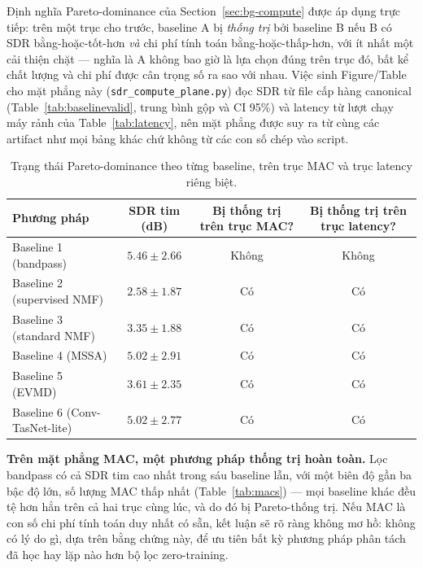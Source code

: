\documentclass[11pt]{article}
\begin{document}
Định nghĩa Pareto-dominance của Section~\ref{sec:bg-compute} được áp
dụng trực tiếp: trên một trục cho trước, baseline A bị \emph{thống trị}
bởi baseline B nếu B có SDR bằng-hoặc-tốt-hơn \emph{và} chi phí tính
toán bằng-hoặc-thấp-hơn, với ít nhất một cải thiện chặt --- nghĩa là A
không bao giờ là lựa chọn đúng trên trục đó, bất kể chất lượng và chi
phí được cân trọng số ra sao với nhau. Việc sinh Figure/Table cho mặt
phẳng này (\texttt{sdr\_compute\_plane.py}) đọc SDR từ file cấp hàng
canonical (Table~\ref{tab:baselinevalid}, trung bình gộp và CI 95\%) và
latency từ lượt chạy máy rảnh của Table~\ref{tab:latency}, nên mặt phẳng
được suy ra từ cùng các artifact như mọi bảng khác chứ không từ các con
số chép vào script.

\begin{table}[H]
\centering
\caption{Trạng thái Pareto-dominance theo từng baseline, trên trục MAC và trục latency riêng biệt.}
\label{tab:pareto}
\begin{tabular}{@{}lccc@{}}
\toprule
Phương pháp & SDR tim (dB) & Bị thống trị trên trục MAC? & Bị thống trị trên trục latency? \\
\midrule
Baseline 1 (bandpass) & $5.46 \pm 2.66$ & Không & Không \\
Baseline 2 (supervised NMF) & $2.58 \pm 1.87$ & Có & Có \\
Baseline 3 (standard NMF) & $3.35 \pm 1.88$ & Có & Có \\
Baseline 4 (MSSA) & $5.02 \pm 2.91$ & Có & Có \\
Baseline 5 (EVMD) & $3.61 \pm 2.35$ & Có & Có \\
Baseline 6 (Conv-TasNet-lite) & $5.02 \pm 2.77$ & Có & Có \\
\bottomrule
\end{tabular}
\end{table}

\textbf{Trên mặt phẳng MAC, một phương pháp thống trị hoàn toàn.} Lọc
bandpass có cả SDR tim cao nhất trong sáu baseline lẫn, với một biên độ
gần ba bậc độ lớn, số lượng MAC thấp nhất (Table~\ref{tab:macs}) --- mọi
baseline khác đều tệ hơn hẳn trên cả hai trục cùng lúc, và do đó bị
Pareto-thống trị. Nếu MAC là con số chi phí tính toán duy nhất có sẵn,
kết luận sẽ rõ ràng không mơ hồ: không có lý do gì, dựa trên bằng chứng
này, để ưu tiên bất kỳ phương pháp phân tách đã học hay lặp nào hơn bộ
lọc zero-training.
\end{document}
